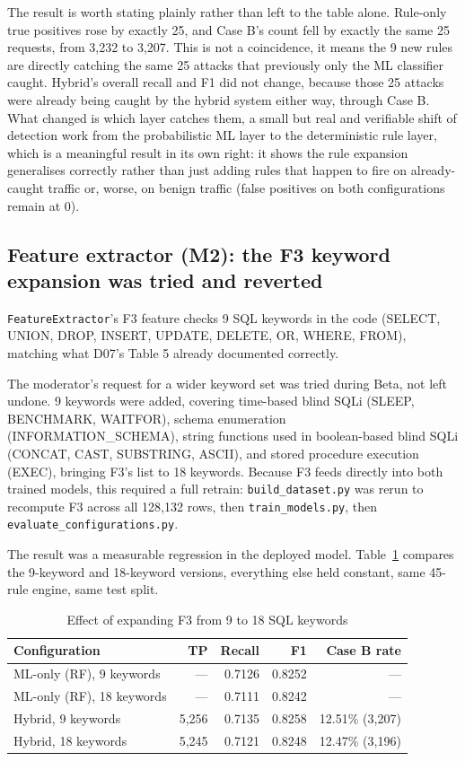 \documentclass{llncs}
\begin{document}
The result is worth stating plainly rather than left to the table alone.
Rule-only true positives rose by exactly 25, and Case B's count fell by
exactly the same 25 requests, from 3{,}232 to 3{,}207. This is not a
coincidence, it means the 9 new rules are directly catching the same
25 attacks that previously only the ML classifier caught. Hybrid's
overall recall and F1 did not change, because those 25 attacks were
already being caught by the hybrid system either way, through Case B.
What changed is which layer catches them, a small but real and
verifiable shift of detection work from the probabilistic ML layer to
the deterministic rule layer, which is a meaningful result in its own
right: it shows the rule expansion generalises correctly rather than
just adding rules that happen to fire on already-caught traffic or,
worse, on benign traffic (false positives on both configurations remain
at 0).

\subsection{Feature extractor (M2): the F3 keyword expansion was tried and reverted}
\texttt{FeatureExtractor}'s F3 feature checks 9 SQL keywords in the
code (SELECT, UNION, DROP, INSERT, UPDATE, DELETE, OR, WHERE, FROM),
matching what D07's Table 5 already documented correctly.

The moderator's request for a wider keyword set was tried during Beta,
not left undone. 9 keywords were added, covering time-based blind SQLi
(SLEEP, BENCHMARK, WAITFOR), schema enumeration
(INFORMATION\_SCHEMA), string functions used in boolean-based blind
SQLi (CONCAT, CAST, SUBSTRING, ASCII), and stored procedure execution
(EXEC), bringing F3's list to 18 keywords. Because F3 feeds directly
into both trained models, this required a full retrain:
\texttt{build\_dataset.py} was rerun to recompute F3 across all
128{,}132 rows, then \texttt{train\_models.py}, then
\texttt{evaluate\_configurations.py}.

The result was a measurable regression in the deployed model.
Table~\ref{tab:f3attempt} compares the 9-keyword and 18-keyword
versions, everything else held constant, same 45-rule engine, same
test split.

\begin{table}[h]
\centering
\caption{Effect of expanding F3 from 9 to 18 SQL keywords}
\label{tab:f3attempt}
\begin{tabular}{lrrrr}
\toprule
\textbf{Configuration} & \textbf{TP} & \textbf{Recall} & \textbf{F1} & \textbf{Case B rate} \\
\midrule
ML-only (RF), 9 keywords & --- & 0.7126 & 0.8252 & --- \\
ML-only (RF), 18 keywords & --- & 0.7111 & 0.8242 & --- \\
Hybrid, 9 keywords & 5{,}256 & 0.7135 & 0.8258 & 12.51\% (3{,}207) \\
Hybrid, 18 keywords & 5{,}245 & 0.7121 & 0.8248 & 12.47\% (3{,}196) \\
\bottomrule
\end{tabular}
\end{table}
\end{document}
